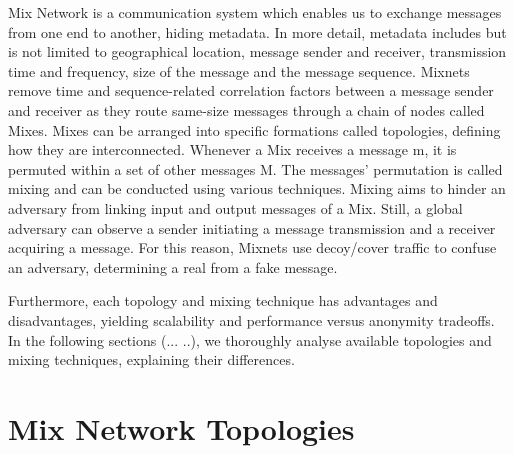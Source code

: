 \documentclass[logo,msc,cyber]{infthesis}   %
\begin{document}
Mix Network is a communication system which enables us to exchange messages from
one end to another, hiding metadata. In more detail, metadata includes but is
not limited to geographical location, message sender and receiver, transmission
time and frequency, size of the message and the message sequence. Mixnets remove
time and sequence-related correlation factors between a message sender and
receiver as they route same-size messages through a chain of nodes called Mixes.
Mixes can be arranged into specific formations called topologies, defining how
they are interconnected. Whenever a Mix receives a message m, it is permuted
within a set of other messages M. The messages' permutation is called mixing and
can be conducted using various techniques. Mixing aims to hinder an adversary
from linking input and output messages of a Mix. Still, a global adversary can
observe a sender initiating a message transmission and a receiver acquiring a
message. For this reason, Mixnets use decoy/cover traffic to confuse an
adversary, determining a real from a fake message. 

Furthermore, each topology and mixing technique has advantages and
disadvantages, yielding scalability and performance versus anonymity tradeoffs.
In the following sections (... ..), we thoroughly analyse available topologies
and mixing techniques, explaining their differences.

\section{Mix Network Topologies}
\end{document}
